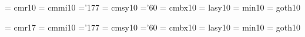  \font\frtnrm  = cmr10     %
 \font\frtnmi  = cmmi10    %
    \skewchar\frtnmi ='177          %
 \font\frtnsy  = cmsy10    %
    \skewchar\frtnsy ='60           %
 \font\frtnbf  = cmbx10    %
 \font\frtnly  = lasy10   %
\font\frtnmin = min10     %
\font\frtngt = goth10	  %

 \font\svtnrm  = cmr17                %
 \font\svtnmi  = cmmi10    %
    \skewchar\svtnmi ='177          %
 \font\svtnsy  = cmsy10    %
    \skewchar\svtnsy ='60           %
 \font\svtnbf  = cmbx10    %
 \font\svtnly  = lasy10   %
\font\svtnmin = min10     %
\font\svtngt = goth10	  %

